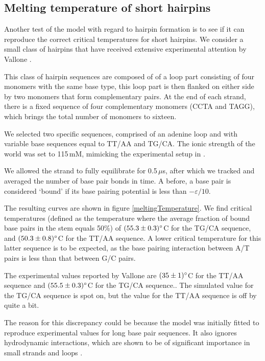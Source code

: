 \subsection{Melting temperature of short hairpins}

Another test of the model with regard to hairpin formation is to see if it can reproduce the correct critical temperatures for short hairpins. We consider a small class of hairpins that have received extensive experimental attention by Vallone \etal \cite{vallone1999melting}.

This class of hairpin sequences are composed of of a loop part consisting of four monomers with the same base type, this loop part is then flanked on either side by two monomers that form complementary pairs. At the end of each strand, there is a fixed sequence of four complementary monomers (CCTA and TAGG), which brings the total number of monomers to sixteen.

We selected two specific sequences, comprised of an adenine loop and with variable base sequences equal to TT/AA and TG/CA. The ionic strength of the world was set to 115\,mM, mimicking the experimental setup in \cite{vallone1999melting}.

We allowed the strand to fully equilibrate for 0.5\,$\mu$s, after which we tracked and averaged the number of base pair bonds in time. A before, a base pair is considered `bound' if its base pairing potential is less than $-\varepsilon / 10$.





The resulting curves are shown in figure \ref{meltingTemperature}. We find critical temperatures (defined as the temperature where the average fraction of bound base pairs in the stem equals 50\%) of $(55.3 \pm 0.3)^{\circ}$C for the TG/CA sequence, and $(50.3 \pm 0.8)^{\circ}$C for the TT/AA sequence. A lower critical temperature for this latter sequence is to be expected, as the base pairing interaction between A/T pairs is less than that between G/C pairs.

The experimental values reported by Vallone \etal are $(35 \pm 1)^{\circ}$C for the TT/AA sequence and $(55.5 \pm 0.3)^{\circ}$C for the TG/CA sequence.\cite{vallone1999melting}. The simulated value for the TG/CA sequence is spot on, but the value for the TT/AA sequence is off by quite a bit.

The reason for this discrepancy could be because the model was initially fitted to reproduce experimental values for long base pair sequences. It also ignores hydrodynamic interactions, which are shown to be of significant importance in small strands and loops \cite{kuznetsov2001semiflexible}.

